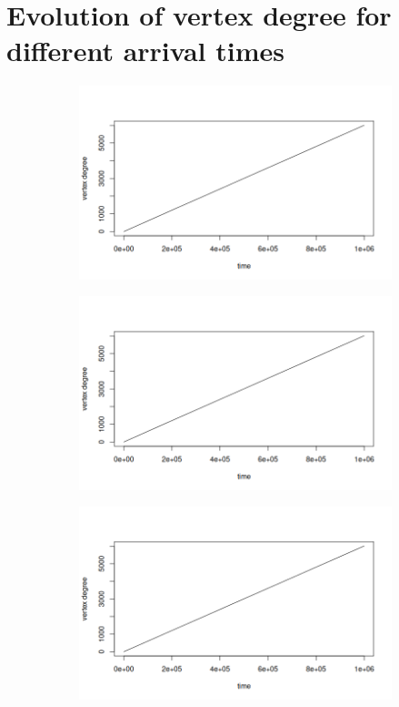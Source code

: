 \section{Evolution of vertex degree for different arrival times} \label{app:evolution}

\begin{figure}[ht]
\centering
\begin{subfigure}{.5\textwidth}
  \centering
  \includegraphics[width=\linewidth]{figures/scaling_NG/sc_ng_0.png}
\end{subfigure}%
\begin{subfigure}{.5\textwidth}
  \centering
  \includegraphics[width=\linewidth]{figures/scaling_NG/sc_ng_1.png}
\end{subfigure}
\begin{subfigure}{.5\textwidth}
  \centering
  \includegraphics[width=\linewidth]{figures/scaling_NG/sc_ng_2.png}

\end{subfigure}
\end{figure}
